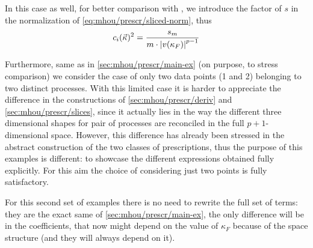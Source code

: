 
In this case as well, for better comparison with \cite{NNPDF:2019ubu}, we
introduce the factor of $s$ in the normalization of \cref{eq:mhou/prescr/sliced-norm}, thus
\begin{equation}
    c_i(\vec{\kappa})^2 = \frac{s_m}{m \cdot \abs{v(\kappa_F)}^{p-1}}
\end{equation}

Furthermore, same as in \cref{sec:mhou/prescr/main-ex} (on purpose, to stress comparison)
we consider the case of only two data points (1 and 2) belonging to two
distinct processes.
With this limited case it is harder to appreciate the difference in the
constructions of \cref{sec:mhou/prescr/deriv} and \cref{sec:mhou/prescr/slices}, since it actually lies
in the way the different three dimensional shapes for pair of processes are
reconciled in the full $p+1$-dimensional space.
However, this difference has already been stressed in the abstract construction
of the two classes of prescriptions, thus the purpose of this examples is
different: to showcase the different expressions obtained fully explicitly.
For this aim the choice of considering just two points is fully satisfactory.

For this second set of examples there is no need to rewrite the full set of
terms: they are the exact same of \cref{sec:mhou/prescr/main-ex}, the only difference will
be in the coefficients, that now might depend on the value of $\kappa_F$
because of the space structure (and they will always depend on it).

